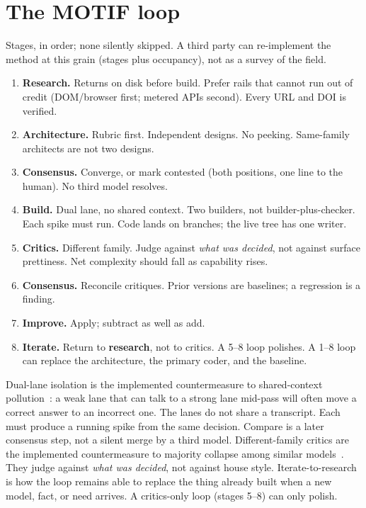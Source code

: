 \documentclass[11pt]{article}
\begin{document}
\section{The MOTIF loop}

Stages, in order; none silently skipped. A third party can
re-implement the method at this grain (stages plus occupancy), not as
a survey of the field.

\begin{enumerate}
\item \textbf{Research.} Returns on disk before build. Prefer rails
that cannot run out of credit (DOM/browser first; metered APIs
second). Every URL and DOI is verified.
\item \textbf{Architecture.} Rubric first. Independent designs. No
peeking. Same-family architects are not two designs.
\item \textbf{Consensus.} Converge, or mark contested (both positions,
one line to the human). No third model resolves.
\item \textbf{Build.} Dual lane, no shared context. Two builders, not
builder-plus-checker. Each spike must run. Code lands on branches;
the live tree has one writer.
\item \textbf{Critics.} Different family. Judge against \emph{what was
decided}, not against surface prettiness. Net complexity should fall
as capability rises.
\item \textbf{Consensus.} Reconcile critiques. Prior versions are
baselines; a regression is a finding.
\item \textbf{Improve.} Apply; subtract as well as add.
\item \textbf{Iterate.} Return to \textbf{research}, not to critics. A
5--8 loop polishes. A 1--8 loop can replace the architecture, the
primary coder, and the baseline.
\end{enumerate}

Dual-lane isolation is the implemented countermeasure to
shared-context pollution~\cite{talkcheap}: a weak lane that can talk
to a strong lane mid-pass will often move a correct answer to an
incorrect one. The lanes do not share a transcript. Each must produce
a running spike from the same decision. Compare is a later consensus
step, not a silent merge by a third model. Different-family critics
are the implemented countermeasure to majority collapse among similar
models~\cite{estornell,debatevote,moreagents}. They judge against
\emph{what was decided}, not against house style. Iterate-to-research
is how the loop remains able to replace the thing already built when a
new model, fact, or need arrives. A critics-only loop (stages 5--8)
can only polish.
\end{document}
